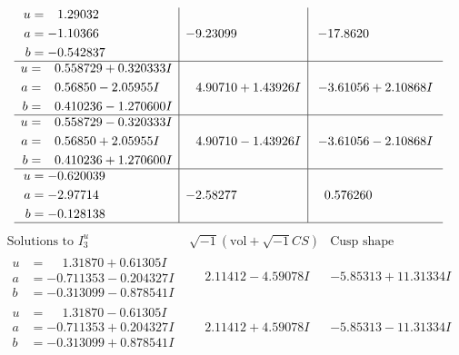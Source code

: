 \documentclass[1p]{elsarticle_modified}
\theoremstyle{definition}
\newcommand{\I}{\sqrt{-1}}
\begin{document}
$$\begin{array}{c|c|c}
\begin{aligned}
u &= \phantom{-}1.29032\phantom{ +0.000000I} \\
a &= -1.10366\phantom{ +0.000000I} \\
b &= -0.542837\phantom{ +0.000000I}\end{aligned}
 & -9.23099\phantom{ +0.000000I} & -17.8620\phantom{ +0.000000I} \\ \hline\begin{aligned}
u &= \phantom{-}0.558729 + 0.320333 I \\
a &= \phantom{-}0.56850 - 2.05955 I \\
b &= \phantom{-}0.410236 - 1.270600 I\end{aligned}
 & \phantom{-}4.90710 + 1.43926 I & -3.61056 + 2.10868 I \\ \hline\begin{aligned}
u &= \phantom{-}0.558729 - 0.320333 I \\
a &= \phantom{-}0.56850 + 2.05955 I \\
b &= \phantom{-}0.410236 + 1.270600 I\end{aligned}
 & \phantom{-}4.90710 - 1.43926 I & -3.61056 - 2.10868 I \\ \hline\begin{aligned}
u &= -0.620039\phantom{ +0.000000I} \\
a &= -2.97714\phantom{ +0.000000I} \\
b &= -0.128138\phantom{ +0.000000I}\end{aligned}
 & -2.58277\phantom{ +0.000000I} & \phantom{-}0.576260\phantom{ +0.000000I}\\
 \hline 
 \end{array}$$\newpage$$\begin{array}{c|c|c}  
\text{Solutions to }I^u_{3}& \I (\text{vol} + \sqrt{-1}CS) & \text{Cusp shape}\\
 \hline 
\begin{aligned}
u &= \phantom{-}1.31870 + 0.61305 I \\
a &= -0.711353 - 0.204327 I \\
b &= -0.313099 - 0.878541 I\end{aligned}
 & \phantom{-}2.11412 - 4.59078 I & -5.85313 + 11.31334 I \\ \hline\begin{aligned}
u &= \phantom{-}1.31870 - 0.61305 I \\
a &= -0.711353 + 0.204327 I \\
b &= -0.313099 + 0.878541 I\end{aligned}
 & \phantom{-}2.11412 + 4.59078 I & -5.85313 - 11.31334 I \\ \hline\begin{aligned}

\end{aligned}
\end{array}$$
\end{document}
